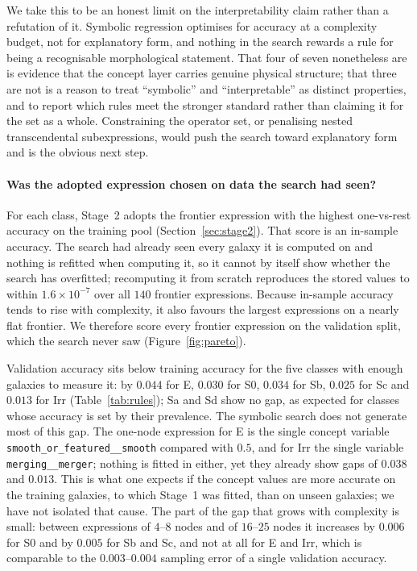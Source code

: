 \documentclass[11pt]{article}
\newcommand{\code}[1]{\texttt{\small #1}}
\begin{document}
We take this to be an honest limit on the interpretability claim rather than a
refutation of it. Symbolic regression optimises for accuracy at a complexity
budget, not for explanatory form, and nothing in the search rewards a rule for
being a recognisable morphological statement. That four of seven nonetheless
are is evidence that the concept layer carries genuine physical structure; that
three are not is a reason to treat ``symbolic'' and ``interpretable'' as
distinct properties, and to report which rules meet the stronger standard
rather than claiming it for the set as a whole. Constraining the operator set,
or penalising nested transcendental subexpressions, would push the search
toward explanatory form and is the obvious next step.

\paragraph{Was the adopted expression chosen on data the search had seen?}
For each class, Stage~2 adopts the frontier expression with the highest
one-vs-rest accuracy on the training pool (Section~\ref{sec:stage2}). That score
is an in-sample accuracy. The search had already seen every galaxy it is
computed on and nothing is refitted when computing it, so it cannot by itself
show whether the search has overfitted; recomputing it from scratch reproduces
the stored values to within $1.6\times10^{-7}$ over all $140$ frontier
expressions. Because in-sample accuracy tends to rise with complexity, it also
favours the largest expressions on a nearly flat frontier. We therefore score
every frontier expression on the validation split, which the search never saw
(Figure~\ref{fig:pareto}).

Validation accuracy sits below training accuracy for the five classes with
enough galaxies to measure it: by $0.044$ for E, $0.030$ for S0,
$0.034$ for Sb, $0.025$ for Sc and $0.013$ for Irr
(Table~\ref{tab:rules}); Sa and Sd show no gap, as expected for classes whose
accuracy is set by their prevalence. The symbolic search does not generate most
of this gap. The one-node expression for E is the single concept variable
\code{smooth\_or\_featured\_\_smooth} compared with $0.5$, and for Irr the single
variable \code{merging\_\_merger}; nothing is fitted in either, yet they already
show gaps of $0.038$ and $0.013$. This is what one expects if the
concept values are more accurate on the training galaxies, to which Stage~1 was
fitted, than on unseen galaxies; we have not isolated that cause. The part of
the gap that grows with complexity is small: between expressions of $4$--$8$ nodes
and of $16$--$25$ nodes it increases by $0.006$ for S0 and by $0.005$ for
Sb and Sc, and not at all for E and Irr, which is comparable to the
$0.003$--$0.004$ sampling error of a single validation accuracy.
\end{document}
